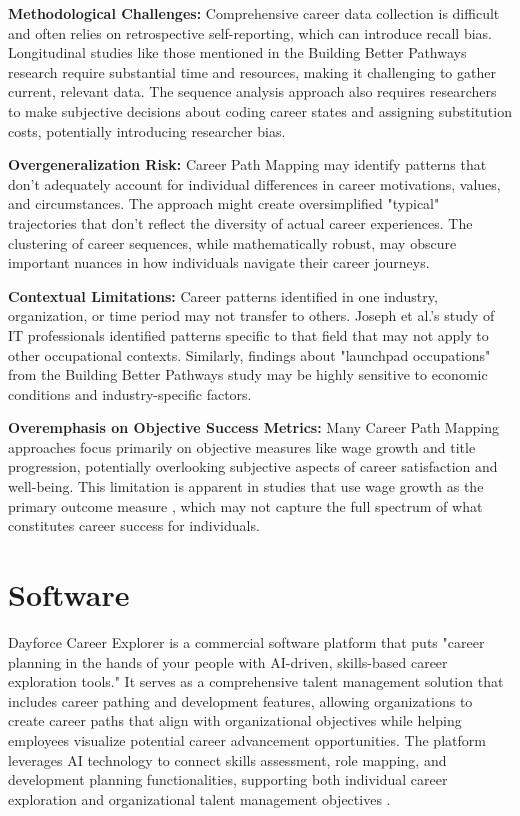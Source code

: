 \documentclass{article}
\begin{document}
\textbf{Methodological Challenges:} Comprehensive career data collection is difficult and often relies on retrospective self-reporting, which can introduce recall bias. Longitudinal studies like those mentioned in the Building Better Pathways research \citep{workforcegps2023} require substantial time and resources, making it challenging to gather current, relevant data. The sequence analysis approach also requires researchers to make subjective decisions about coding career states and assigning substitution costs, potentially introducing researcher bias.

\textbf{Overgeneralization Risk:} Career Path Mapping may identify patterns that don't adequately account for individual differences in career motivations, values, and circumstances. The approach might create oversimplified "typical" trajectories that don't reflect the diversity of actual career experiences. The clustering of career sequences, while mathematically robust, may obscure important nuances in how individuals navigate their career journeys.

\textbf{Contextual Limitations:} Career patterns identified in one industry, organization, or time period may not transfer to others. Joseph et al.'s study of IT professionals \citep{joseph2012} identified patterns specific to that field that may not apply to other occupational contexts. Similarly, findings about "launchpad occupations" from the Building Better Pathways study \citep{workforcegps2023} may be highly sensitive to economic conditions and industry-specific factors.

\textbf{Overemphasis on Objective Success Metrics:} Many Career Path Mapping approaches focus primarily on objective measures like wage growth and title progression, potentially overlooking subjective aspects of career satisfaction and well-being. This limitation is apparent in studies that use wage growth as the primary outcome measure \citep{workforcegps2023}, which may not capture the full spectrum of what constitutes career success for individuals.

\section{Software}

Dayforce Career Explorer is a commercial software platform that puts "career planning in the hands of your people with AI-driven, skills-based career exploration tools." It serves as a comprehensive talent management solution that includes career pathing and development features, allowing organizations to create career paths that align with organizational objectives while helping employees visualize potential career advancement opportunities. The platform leverages AI technology to connect skills assessment, role mapping, and development planning functionalities, supporting both individual career exploration and organizational talent management objectives \citep{dayforce2024}.
\end{document}

